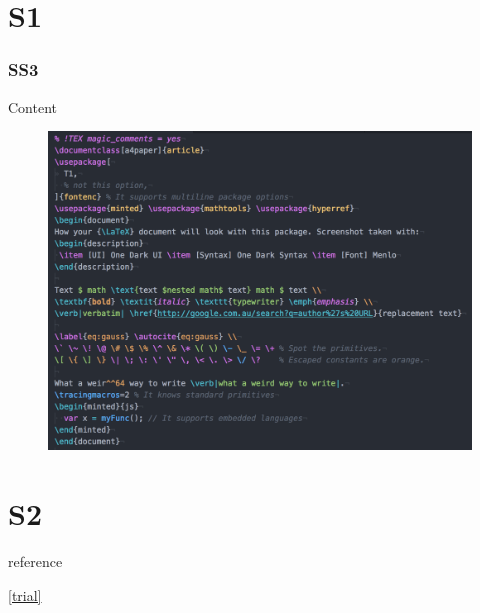 \documentclass{article}
\begin{document}
\section{S1}
\subsubsection{{SS3}}

% 
Content


\begin{figure}[]
  \centering
  \includegraphics[width=\textwidth]{fig1}
  \caption{}
  \label{}
\end{figure}




\section{S2}
reference


\ref{trial}
\end{document}
